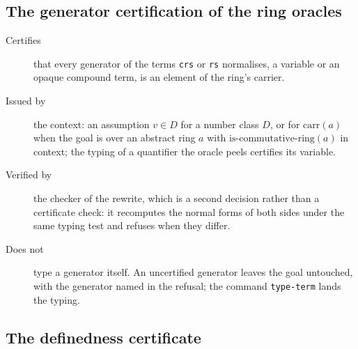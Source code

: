 \subsection{The generator certification of the ring oracles}

\begin{description}
\item[Certifies] that every generator of the terms \texttt{crs} or
  \texttt{rs} normalises, a variable or an opaque compound term, is an
  element of the ring's carrier.
\item[Issued by] the context: an assumption $v \in D$ for a number class
  $D$, or for $\mathrm{carr}(a)$ when the goal is over an abstract ring
  $a$ with $\mathrm{is\text{-}commutative\text{-}ring}(a)$ in context; the
  typing of a quantifier the oracle peels certifies its variable.
\item[Verified by] the checker of the rewrite, which is a second decision
  rather than a certificate check: it recomputes the normal forms of both
  sides under the same typing test and refuses when they differ.
\item[Does not] type a generator itself.  An uncertified generator leaves
  the goal untouched, with the generator named in the refusal; the
  command \texttt{type-term} lands the typing.
\end{description}

\subsection{The definedness certificate}\label{sec:definedness-certificate}

